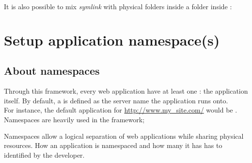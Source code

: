 \documentclass[pdftex,12pt,a4paper]{article}
\begin{document}
It is also possible to mix \emph{symlink} with physical folders inside a  folder inside  :
\begin{unbreakable}
\end{unbreakable}

\section{Setup application namespace(s)}

\subsection{About namespaces}
Through this framework, every web application have at least one  : the application itself.
By default, a  is defined as the server name the application runs onto. \\
For instance, the default application  for \url{http://www.my_site.com/} would be .
Namespaces are heavily used in the framework;

Namespaces allow a logical separation of web applications while sharing physical resources.
How an application is namespaced and how many it has has to identified by the developer.
\end{document}
